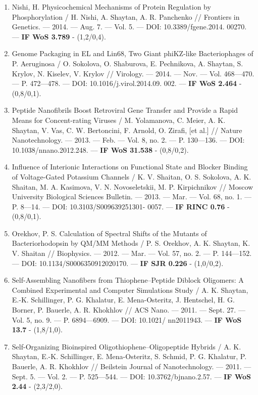 \begin{frame}[allowframebreaks]
\begin{enumerate}
 \item  Nishi, H. Physicochemical Mechanisms of Protein Regulation by Phosphorylation / H. Nishi, A. Shaytan, A. R. Panchenko // Frontiers in Genetics. –– 2014. –– Aug. 7. –– Vol. 5. –– DOI: 10.3389/fgene.2014. 00270. –– \textbf{IF WoS 3.789} - (1,2/0,4).
 \item  Genome Packaging in EL and Lin68, Two Giant phiKZ-like Bacteriophages of P. Aeruginosa / O. Sokolova, O. Shaburova, E. Pechnikova, A. Shaytan, S. Krylov, N. Kiselev, V. Krylov // Virology. –– 2014. –– Nov. –– Vol. 468––470. –– P. 472––478. –– DOI: 10.1016/j.virol.2014.09. 002. –– \textbf{IF WoS 2.464} - (0,8/0,1).
 \item  Peptide Nanofibrils Boost Retroviral Gene Transfer and Provide a Rapid Means for Concent-rating Viruses / M. Yolamanova, C. Meier, A. K. Shaytan, V. Vas, C. W. Bertoncini, F. Arnold, O. Zirafi, [et al.] // Nature Nanotechnology. –– 2013. –– Feb. –– Vol. 8, no. 2. –– P. 130––136. –– DOI: 10.1038/nnano.2012.248. –– \textbf{IF WoS 31.538} - (0,8/0,2).
 \item  Influence of Interionic Interactions on Functional State and Blocker Binding of Voltage-Gated Potassium Channels / K. V. Shaitan, O. S. Sokolova, A. K. Shaitan, M. A. Kasimova, V. N. Novoseletskii, M. P. Kirpichnikov // Moscow University Biological Sciences Bulletin. –– 2013. –– Mar. –– Vol. 68, no. 1. –– P. 8––14. –– DOI: 10.3103/S009639251301- 0057. –– \textbf{IF RINC 0.76} - (0,8/0,1).
 \item  Orekhov, P. S. Calculation of Spectral Shifts of the Mutants of Bacteriorhodopsin by QM/MM Methods / P. S. Orekhov, A. K. Shaytan, K. V. Shaitan // Biophysics. –– 2012. –– Mar. –– Vol. 57, no. 2. –– P. 144––152. –– DOI: 10.1134/S0006350912020170. –– \textbf{IF SJR 0.226} - (1,0/0,2).
 \item  Self-Assembling Nanofibers from Thiophene–Peptide Diblock Oligomers: A Combined Experimental and Computer Simulations Study / A. K. Shaytan, E.-K. Schillinger, P. G. Khalatur, E. Mena-Osteritz, J. Hentschel, H. G. Borner, P. Bauerle, A. R. Khokhlov // ACS Nano. –– 2011. –– Sept. 27. –– Vol. 5, no. 9. –– P. 6894––6909. –– DOI: 10.1021/ nn2011943. –– \textbf{IF WoS 13.7} - (1,8/1,0).
 \item  Self-Organizing Bioinspired Oligothiophene–Oligopeptide Hybrids / A. K. Shaytan, E.-K. Schillinger, E. Mena-Osteritz, S. Schmid, P. G. Khalatur, P. Bauerle, A. R. Khokhlov // Beilstein Journal of Nanotechnology. –– 2011. –– Sept. 5. –– Vol. 2. –– P. 525––544. –– DOI: 10.3762/bjnano.2.57. –– \textbf{IF WoS 2.44} - (2,3/2,0).


\end{enumerate}

\end{frame}
